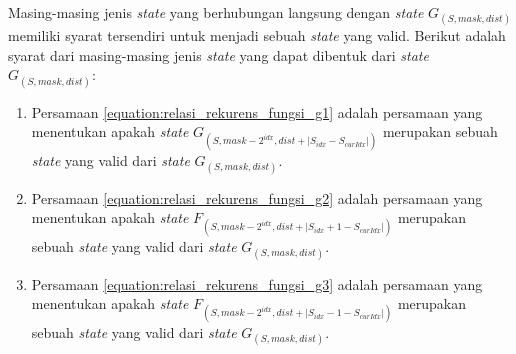 Masing-masing jenis \textit{state} yang berhubungan langsung dengan \textit{state} $G_{(S, mask, dist)}$ memiliki syarat tersendiri untuk menjadi sebuah \textit{state} yang valid. Berikut adalah syarat dari masing-masing jenis \textit{state} yang dapat dibentuk dari \textit{state} $G_{(S, mask, dist)}$:
\begin{enumerate}
	\item Persamaan \ref{equation:relasi_rekurens_fungsi_g1} adalah persamaan yang menentukan apakah \textit{state} $ G_{(S, mask-2^{idx}, dist+|S_{idx}-S_{curIdx}|)} $ merupakan sebuah \textit{state} yang valid dari \textit{state} $G_{(S, mask, dist)}$.
	\item Persamaan \ref{equation:relasi_rekurens_fungsi_g2} adalah persamaan yang menentukan apakah \textit{state} $ F_{(S, mask-2^{idx}, dist+|S_{idx}+1-S_{curIdx}|)} $ merupakan sebuah \textit{state} yang valid dari \textit{state} $G_{(S, mask, dist)}$.
	\item Persamaan \ref{equation:relasi_rekurens_fungsi_g3} adalah persamaan yang menentukan apakah \textit{state} $ F_{(S, mask-2^{idx}, dist+|S_{idx}-1-S_{curIdx}|)} $ merupakan sebuah \textit{state} yang valid dari \textit{state} $G_{(S, mask, dist)}$. 
\end{enumerate}

